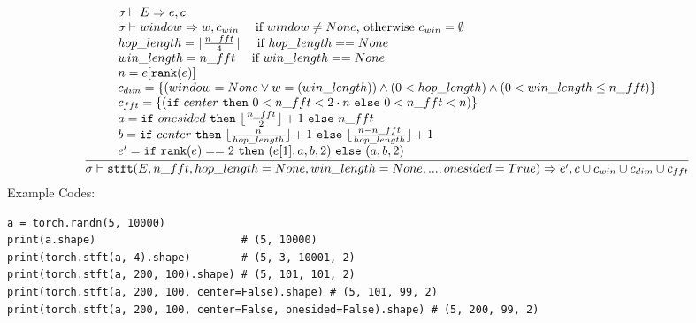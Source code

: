 \documentclass{article}
\begin{document}
\begin{align*}
  \frac
  {
    \begin{array}{l}
      \sigma \vdash E \Rightarrow e, c \\
      \sigma \vdash window \Rightarrow w, c_{win} \,\,\,\,\,\,\,\, \text{if $window \neq None$, otherwise $c_{win} = \emptyset$}\\
      hop\_length = \lfloor \frac{n\_fft}{4} \rfloor \,\,\,\,\,\,\,\, \text{if $hop\_length == None$} \\
      win\_length = n\_fft \,\,\,\,\,\,\,\, \text{if $win\_length == None$} \\
      n = e[\mathtt{rank(}e\mathtt{)}] \\
      c_{dim} = \{ (window = None \lor w = (win\_length)) \land
        (0 < hop\_length) \land (0 < win\_length \leq n\_fft) \} \\
      c_{fft} = \{ (\mathtt{if}\,\,center\,\,\mathtt{then}\,\,0 < n\_fft < 2 \cdot n\,\,\mathtt{else}\,\,0 < n\_fft < n) \} \\
      a = \mathtt{if}\,\,onesided\,\,\mathtt{then}\,\,\lfloor \frac{n\_fft}{2} \rfloor + 1\,\,\mathtt{else}\,\,n\_fft \\
      b = \mathtt{if}\,\,center\,\,\mathtt{then}\,\,\lfloor \frac{n}{hop\_length} \rfloor + 1\,\,\mathtt{else}\,\,\lfloor \frac{n - n\_fft}{hop\_length} \rfloor + 1 \\
      e' = \mathtt{if}\,\,\mathtt{rank(}e\mathtt{)} == 2\,\,\mathtt{then}\,\,(e[1], a, b, 2)\,\,\mathtt{else}\,\,(a, b, 2)
    \end{array}
  }
  {
    \sigma \vdash \mathtt{stft(}E, n\_fft, hop\_length=None, win\_length=None, ...,
      onesided=True\mathtt{)} \Rightarrow e', c \cup c_{win} \cup c_{dim} \cup c_{fft}
  }
\end{align*}
Example Codes:
\begin{Verbatim}[tabsize=4,xleftmargin=2em]
a = torch.randn(5, 10000)
print(a.shape)                       # (5, 10000)
print(torch.stft(a, 4).shape)        # (5, 3, 10001, 2)
print(torch.stft(a, 200, 100).shape) # (5, 101, 101, 2)
print(torch.stft(a, 200, 100, center=False).shape) # (5, 101, 99, 2)
print(torch.stft(a, 200, 100, center=False, onesided=False).shape) # (5, 200, 99, 2)
\end{Verbatim}
  
\end{document}
